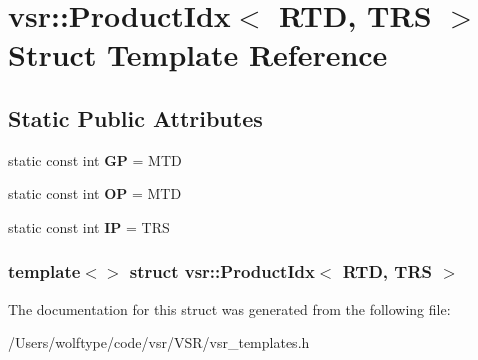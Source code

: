 \hypertarget{structvsr_1_1_product_idx_3_01_r_t_d_00_01_t_r_s_01_4}{\section{vsr\-:\-:Product\-Idx$<$ R\-T\-D, T\-R\-S $>$ Struct Template Reference}
\label{structvsr_1_1_product_idx_3_01_r_t_d_00_01_t_r_s_01_4}
}
\subsection*{Static Public Attributes}
\begin{DoxyCompactItemize}
\item 
\hypertarget{structvsr_1_1_product_idx_3_01_r_t_d_00_01_t_r_s_01_4_ae686229d803ac415d793fead92fe6d7f}{static const int {\bfseries G\-P} = M\-T\-D}\label{structvsr_1_1_product_idx_3_01_r_t_d_00_01_t_r_s_01_4_ae686229d803ac415d793fead92fe6d7f}

\item 
\hypertarget{structvsr_1_1_product_idx_3_01_r_t_d_00_01_t_r_s_01_4_a7e0ddec9bc95766b5d6e2ae70b6a1377}{static const int {\bfseries O\-P} = M\-T\-D}\label{structvsr_1_1_product_idx_3_01_r_t_d_00_01_t_r_s_01_4_a7e0ddec9bc95766b5d6e2ae70b6a1377}

\item 
\hypertarget{structvsr_1_1_product_idx_3_01_r_t_d_00_01_t_r_s_01_4_ac0b789ff5c848cd477df3cf3dba4a6df}{static const int {\bfseries I\-P} = T\-R\-S}\label{structvsr_1_1_product_idx_3_01_r_t_d_00_01_t_r_s_01_4_ac0b789ff5c848cd477df3cf3dba4a6df}

\end{DoxyCompactItemize}
\subsubsection*{template$<$$>$ struct vsr\-::\-Product\-Idx$<$ R\-T\-D, T\-R\-S $>$}



The documentation for this struct was generated from the following file\-:\begin{DoxyCompactItemize}
\item 
/\-Users/wolftype/code/vsr/\-V\-S\-R/vsr\-\_\-templates.\-h\end{DoxyCompactItemize}
